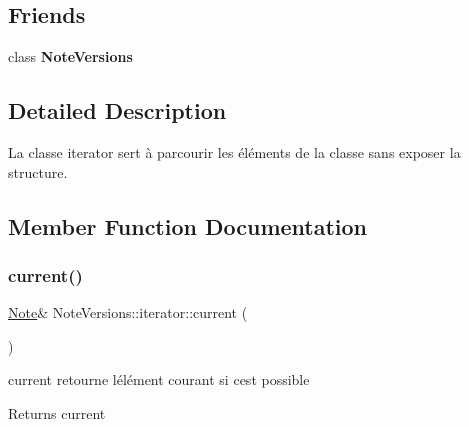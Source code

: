 \subsection*{Friends}
\begin{DoxyCompactItemize}
\item 
\mbox{\label{classNoteVersions_1_1iterator_a1485bf2f5e79100d22491341fc00da08}} 
class {\bfseries Note\+Versions}
\end{DoxyCompactItemize}


\subsection{Detailed Description}
La classe iterator sert à parcourir les éléments de la classe sans exposer la structure. 

\subsection{Member Function Documentation}
\mbox{\label{classNoteVersions_1_1iterator_a564a1e530f36e8eecdbece8b64c100e1}} 
\subsubsection{\texorpdfstring{current()}{current()}}
{\footnotesize\ttfamily \hyperlink{classNote}{Note}\& Note\+Versions\+::iterator\+::current (\begin{DoxyParamCaption}{ }\end{DoxyParamCaption})\hspace{0.3cm}{\ttfamily [inline]}}



current retourne l\textquotesingle{}élément courant si c\textquotesingle{}est possible 

\begin{DoxyReturn}{Returns}
current 
\end{DoxyReturn}
\mbox{\label{classNoteVersions_1_1iterator_a981d1e3329e25ef490506907839b7ce8}} 
